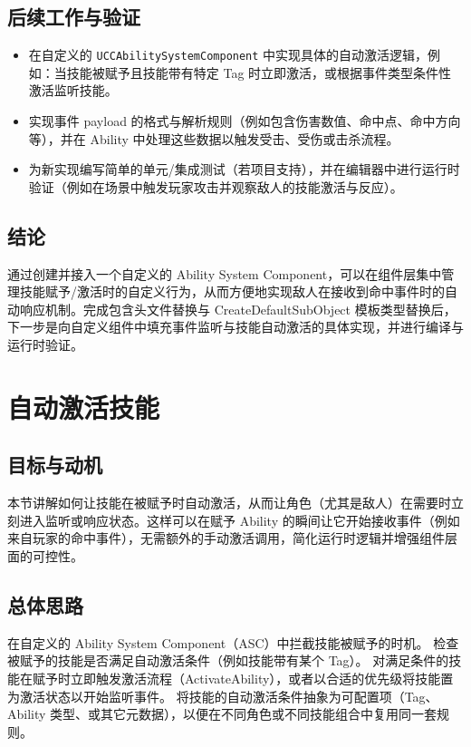 \documentclass[10pt,CJKmath]{zhbook-v1}
\begin{document}
\subsection{后续工作与验证}
\begin{itemize}
\item 在自定义的 \texttt{UCCAbilitySystemComponent} 中实现具体的自动激活逻辑，例如：当技能被赋予且技能带有特定 Tag 时立即激活，或根据事件类型条件性激活监听技能。
\item 实现事件 payload 的格式与解析规则（例如包含伤害数值、命中点、命中方向等），并在 Ability 中处理这些数据以触发受击、受伤或击杀流程。
\item 为新实现编写简单的单元/集成测试（若项目支持），并在编辑器中进行运行时验证（例如在场景中触发玩家攻击并观察敌人的技能激活与反应）。
\end{itemize}

\subsection{结论}
通过创建并接入一个自定义的 Ability System Component，可以在组件层集中管理技能赋予/激活时的自定义行为，从而方便地实现敌人在接收到命中事件时的自动响应机制。完成包含头文件替换与 CreateDefaultSubObject 模板类型替换后，下一步是向自定义组件中填充事件监听与技能自动激活的具体实现，并进行编译与运行时验证。



\section{自动激活技能}

\subsection{目标与动机}
本节讲解如何让技能在被赋予时自动激活，从而让角色（尤其是敌人）在需要时立刻进入监听或响应状态。这样可以在赋予 Ability 的瞬间让它开始接收事件（例如来自玩家的命中事件），无需额外的手动激活调用，简化运行时逻辑并增强组件层面的可控性。

\subsection{总体思路}

在自定义的 Ability System Component（ASC）中拦截技能被赋予的时机。
检查被赋予的技能是否满足自动激活条件（例如技能带有某个 Tag）。
对满足条件的技能在赋予时立即触发激活流程（ActivateAbility），或者以合适的优先级将技能置为激活状态以开始监听事件。
将技能的自动激活条件抽象为可配置项（Tag、Ability 类型、或其它元数据），以便在不同角色或不同技能组合中复用同一套规则。
\end{document}
